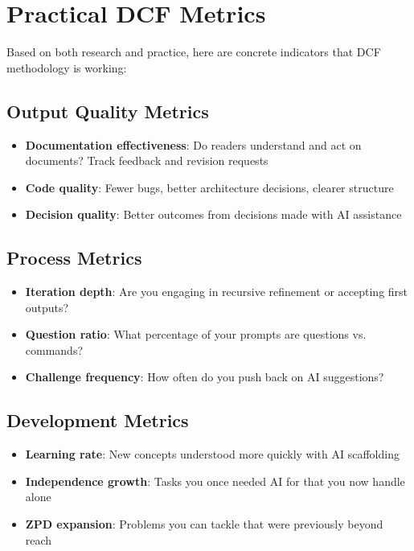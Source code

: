 \section{Practical DCF Metrics}

Based on both research and practice, here are concrete indicators that DCF methodology is working:

\subsection{Output Quality Metrics}

\begin{itemize}
    \item \textbf{Documentation effectiveness}: Do readers understand and act on documents? Track feedback and revision requests
    \item \textbf{Code quality}: Fewer bugs, better architecture decisions, clearer structure
    \item \textbf{Decision quality}: Better outcomes from decisions made with AI assistance
\end{itemize}

\subsection{Process Metrics}

\begin{itemize}
    \item \textbf{Iteration depth}: Are you engaging in recursive refinement or accepting first outputs?
    \item \textbf{Question ratio}: What percentage of your prompts are questions vs. commands?
    \item \textbf{Challenge frequency}: How often do you push back on AI suggestions?
\end{itemize}

\subsection{Development Metrics}

\begin{itemize}
    \item \textbf{Learning rate}: New concepts understood more quickly with AI scaffolding
    \item \textbf{Independence growth}: Tasks you once needed AI for that you now handle alone
    \item \textbf{ZPD expansion}: Problems you can tackle that were previously beyond reach
\end{itemize}


